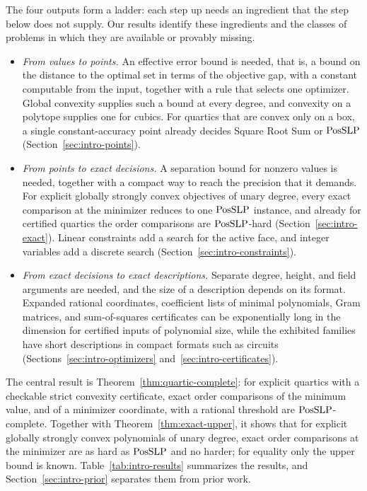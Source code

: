 The four outputs form a ladder: each step up needs an ingredient that the
step below does not supply. Our results identify these ingredients and the
classes of problems in which they are available or provably missing.
\begin{itemize}
\item \emph{From values to points.} An effective error bound is needed, that
  is, a bound on the distance to the optimal set in terms of the objective
  gap, with a constant computable from the input, together with a rule that
  selects one optimizer. Global convexity supplies such a bound at every
  degree, and convexity on a polytope supplies one for cubics. For quartics
  that are convex only on a box, a single constant-accuracy point already
  decides Square Root Sum or $\mathrm{PosSLP}$ (Section~\ref{sec:intro-points}).
\item \emph{From points to exact decisions.} A separation bound for nonzero
  values is needed, together with a compact way to reach the precision that
  it demands. For explicit globally strongly convex objectives of unary
  degree, every exact comparison at the minimizer reduces to one $\mathrm{PosSLP}$
  instance, and already for certified quartics the order comparisons are
  $\mathrm{PosSLP}$-hard (Section~\ref{sec:intro-exact}). Linear constraints add a
  search for the active face, and integer variables add a discrete search
  (Section~\ref{sec:intro-constraints}).
\item \emph{From exact decisions to exact descriptions.} Separate degree,
  height, and field arguments are needed, and the size of a description
  depends on its format. Expanded rational coordinates, coefficient lists of
  minimal polynomials, Gram matrices, and sum-of-squares certificates can be
  exponentially long in the dimension for certified inputs of polynomial
  size, while the exhibited families have short descriptions in compact
  formats such as circuits (Sections~\ref{sec:intro-optimizers}
  and~\ref{sec:intro-certificates}).
\end{itemize}
The central result is Theorem~\ref{thm:quartic-complete}: for explicit
quartics with a checkable strict convexity certificate, exact order
comparisons of the minimum value, and of a minimizer coordinate, with a
rational threshold are $\mathrm{PosSLP}$-complete. Together with
Theorem~\ref{thm:exact-upper}, it shows that for explicit globally strongly
convex polynomials of unary degree, exact order comparisons at the minimizer
are as hard as $\mathrm{PosSLP}$ and no harder; for equality only the upper bound is
known. Table~\ref{tab:intro-results} summarizes the results, and
Section~\ref{sec:intro-prior} separates them from prior work.

